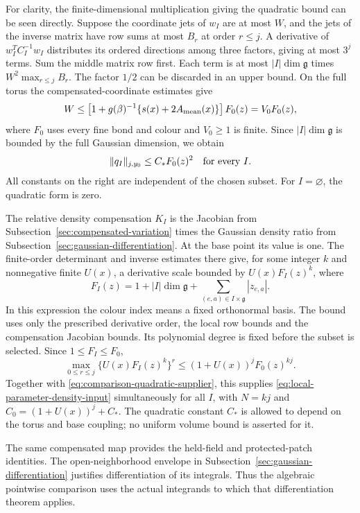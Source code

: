 For clarity, the finite-dimensional multiplication giving the
quadratic bound can be seen directly. Suppose the coordinate jets
of $w_I$ are at most $W$, and the jets of the inverse matrix have
row sums at most $B_r$ at order $r\le j$. A derivative of
$w_I^TC_I^{-1}w_I$ distributes its ordered directions among three
factors, giving at most $3^j$ terms. Sum the middle matrix row first.
Each term is at most $|I|\dim\mathfrak g$ times
$W^2\max_{r\le j}B_r$. The factor $1/2$ can be discarded in an upper
bound. On the full torus the compensated-coordinate estimates give
\[
 W\le \left[1+g(\beta)^{-1}
           \{s(x)+2A_{\rm mean}(x)\}\right]F_0(z)=V_0F_0(z),
\]
where $F_0$ uses every fine bond and colour and $V_0\ge1$ is finite.
Since $|I|\dim\mathfrak g$ is bounded by the full Gaussian dimension,
we obtain
\begin{equation}\label{eq:comparison-quadratic-supplier}
                 \|q_I\|_{j,y_0}\le C_*F_0(z)^2
                         \quad\hbox{for every }I.
\end{equation}
All constants on the right are independent of the chosen subset.
For $I=\varnothing$, the quadratic form is zero.

The relative density compensation $K_I$ is the Jacobian from
Subsection~\ref{sec:compensated-variation} times the Gaussian density
ratio from Subsection~\ref{sec:gaussian-differentiation}. At the base
point its value is one. The finite-order determinant and inverse
estimates there give, for some integer $k$ and nonnegative finite
$U(x)$, a derivative scale bounded by
$U(x)F_I(z)^k$, where
\[
              F_I(z)=1+|I|\dim\mathfrak g
                          +\sum_{(e,a)\in I\times\mathfrak g}|z_{e,a}|.
\]
In this expression the colour index means a fixed orthonormal basis.
The bound uses only the prescribed derivative order, the local row
bounds and the compensation Jacobian bounds. Its polynomial degree
is fixed before the subset is selected. Since $1\le F_I\le F_0$,
\[
 \max_{0\le r\le j}\{U(x)F_I(z)^k\}^r
        \le(1+U(x))^jF_0(z)^{kj}.
\]
Together with \eqref{eq:comparison-quadratic-supplier}, this supplies
\eqref{eq:local-parameter-density-input} simultaneously for all $I$,
with $N=kj$ and
$C_0=(1+U(x))^j+C_*$. The quadratic constant $C_*$ is allowed to
depend on the torus and base coupling; no uniform volume bound is
asserted for it.

The same compensated map provides the held-field and protected-patch
identities. The open-neighborhood envelope in
Subsection~\ref{sec:gaussian-differentiation} justifies differentiation
of its integrals. Thus the algebraic pointwise comparison uses the
actual integrands to which that differentiation theorem applies.

